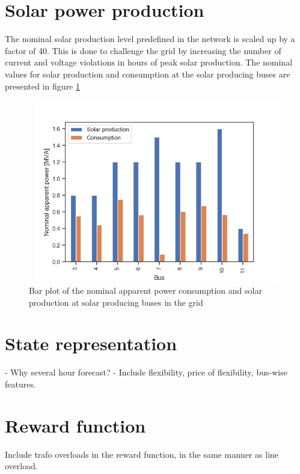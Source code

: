 \documentclass[class=book, crop=false]{standalone}
\begin{document}
\section{Solar power production}
The nominal solar production level predefined in the network is scaled up by a factor of 40. This is done to challenge the grid by increasing the number of current and voltage violations in hours of peak solar production. The nominal values for solar production and consumption at the solar producing buses are presented in figure \ref{fig:discussion:nominal_sgen}


\begin{figure}[h]
    \center
\includegraphics[height=8cm, width=12cm]{figures/nominal_sgen.png}
    \caption[size = 9]{Bar plot of the nominal apparent power consumption and solar production at solar producing buses in the grid}
    \label{fig:discussion:nominal_sgen}
\end{figure}




\section{State representation}
- Why several hour forecast?
- Include flexibility, price of flexibility, bus-wise features. 


\section{Reward function}
Include trafo overloads in the reward function, in the same manner as line overload. 
\end{document}
